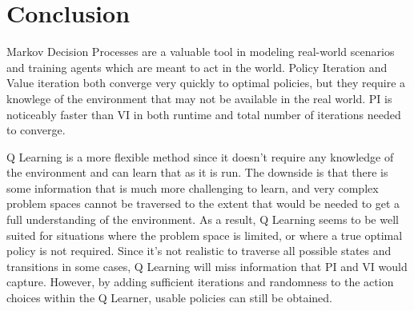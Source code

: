 \documentclass[
	letterpaper, %
]{mlreport}
\begin{document}
\section{Conclusion}
Markov Decision Processes are a valuable tool in modeling real-world scenarios and training agents which are meant to act in the world. Policy Iteration and Value iteration both converge very quickly to optimal policies, but they require a knowlege of the environment that may not be available in the real world. PI is noticeably faster than VI in both runtime and total number of iterations needed to converge.

Q Learning is a more flexible method since it doesn't require any knowledge of the environment and can learn that as it is run. The downside is that there is some information that is much more challenging to learn, and very complex problem spaces cannot be traversed to the extent that would be needed to get a full understanding of the environment. As a result, Q Learning seems to be well suited for situations where the problem space is limited, or where a true optimal policy is not required. Since it's not realistic to traverse all possible states and transitions in some cases, Q Learning will miss information that PI and VI would capture. However, by adding sufficient iterations and randomness to the action choices within the Q Learner, usable policies can still be obtained.

\nocite{Mitchell}
\printbibliography
\end{document}
